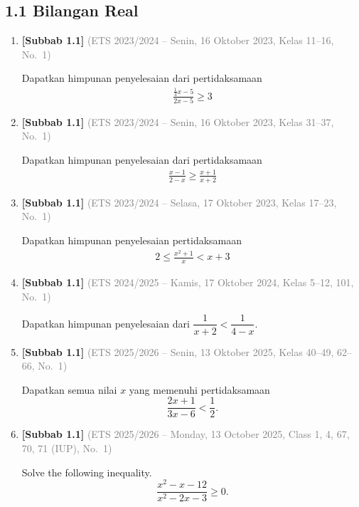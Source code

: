 \documentclass[10pt,openany,a4paper]{article}
\theoremstyle{definition}
\theoremstyle{definition}
\theoremstyle{plain}
\begin{document}
\subsection*{1.1 \quad Bilangan Real}
\begin{enumerate}
\setcounter{enumi}{0}
    \item \textbf{[Subbab 1.1]} {\footnotesize\textcolor{gray}{(ETS 2023/2024 -- Senin, 16 Oktober 2023, Kelas 11--16, No.~1)}}\par
    Dapatkan himpunan penyelesaian dari pertidaksamaan
    \begin{align*}
        \frac{\frac{1}{3}x-5}{2x-5}\geq 3
    \end{align*}

    \item \textbf{[Subbab 1.1]} {\footnotesize\textcolor{gray}{(ETS 2023/2024 -- Senin, 16 Oktober 2023, Kelas 31--37, No.~1)}}\par
    Dapatkan himpunan penyelesaian dari pertidaksamaan
    \begin{align*}
        \frac{x-1}{2-x}\geq\frac{x+1}{x+2}
    \end{align*}

    \item \textbf{[Subbab 1.1]} {\footnotesize\textcolor{gray}{(ETS 2023/2024 -- Selasa, 17 Oktober 2023, Kelas 17--23, No.~1)}}\par
    Dapatkan himpunan penyelesaian pertidaksamaan
    \begin{align*}
        2\leq\frac{x^2+1}{x}<x+3
    \end{align*}

    \item \textbf{[Subbab 1.1]} {\footnotesize\textcolor{gray}{(ETS 2024/2025 -- Kamis, 17 Oktober 2024, Kelas 5--12, 101, No.~1)}}\par
    Dapatkan himpunan penyelesaian dari $\dfrac{1}{x+2}<\dfrac{1}{4-x}$.

    \item \textbf{[Subbab 1.1]} {\footnotesize\textcolor{gray}{(ETS 2025/2026 -- Senin, 13 Oktober 2025, Kelas 40--49, 62--66, No.~1)}}\par
    Dapatkan semua nilai $x$ yang memenuhi pertidaksamaan
    \[
        \dfrac{2x + 1}{3x - 6} < \dfrac{1}{2}.
    \]

    \item \textbf{[Subbab 1.1]} {\footnotesize\textcolor{gray}{(ETS 2025/2026 -- Monday, 13 October 2025, Class 1, 4, 67, 70, 71 (IUP), No.~1)}}\par
    Solve the following inequality.
    \[ \frac{x^2 - x - 12}{x^2 - 2x - 3} \ge 0. \]


\end{enumerate}
\end{document}
